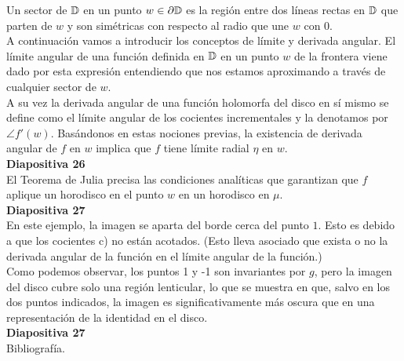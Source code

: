 \documentclass[spanish, a4paper, 12pt]{article}
\begin{document}
Un sector de $\mathbb{D}$ en un punto $w \in \partial \mathbb{D}$ es la región entre dos líneas rectas en $\mathbb{D}$ que parten de $w$ y son simétricas con respecto al radio que une $w$ con $0$. \\

A continuación vamos a introducir los conceptos de límite y derivada angular. El límite angular de una función definida en $\mathbb{D}$ en un punto $w$ de la frontera viene dado por esta expresión entendiendo que nos estamos aproximando a través de cualquier sector de $w$. \\

A su vez la derivada angular de una función holomorfa del disco en sí mismo se define como el límite angular de los cocientes incrementales y la denotamos por $\angle f'(w)$. Basándonos en estas nociones previas, la existencia de derivada angular de $f$ en $w$ implica que $f$ tiene límite radial $\eta$ en $w$. \\

\textbf{Diapositiva 26} \\

El Teorema de Julia precisa las condiciones analíticas que garantizan que $f$ aplique un horodisco en el punto $w$ en un horodisco en $\mu$.\\

\textbf{Diapositiva 27} \\

En este ejemplo, la imagen se aparta del borde cerca del punto $1$. Esto es debido a que los cocientes c) no están acotados. (Esto lleva asociado que exista o no la derivada angular de la función en el límite angular de la función.) \\

Como podemos observar, los puntos 1 y -1 son invariantes por $g$, pero la imagen del disco cubre solo una región lenticular, lo que se muestra en que, salvo en los dos puntos indicados, la imagen es significativamente más oscura que en una representación de la identidad en el disco. \\

\textbf{Diapositiva 27} \\

Bibliografía. \\
\end{document}
